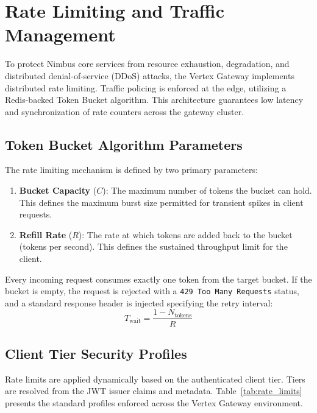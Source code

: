 \section{Rate Limiting and Traffic Management}
\label{sec:rate_limiting}

To protect Nimbus core services from resource exhaustion, degradation, and distributed denial-of-service (DDoS) attacks, the Vertex Gateway implements distributed rate limiting. Traffic policing is enforced at the edge, utilizing a Redis-backed Token Bucket algorithm. This architecture guarantees low latency and synchronization of rate counters across the gateway cluster.

\subsection{Token Bucket Algorithm Parameters}
The rate limiting mechanism is defined by two primary parameters:
\begin{enumerate}
    \item \textbf{Bucket Capacity} ($C$): The maximum number of tokens the bucket can hold. This defines the maximum burst size permitted for transient spikes in client requests.
    \item \textbf{Refill Rate} ($R$): The rate at which tokens are added back to the bucket (tokens per second). This defines the sustained throughput limit for the client.
\end{enumerate}

Every incoming request consumes exactly one token from the target bucket. If the bucket is empty, the request is rejected with a \texttt{429 Too Many Requests} status, and a standard response header is injected specifying the retry interval:
\begin{equation}
    T_{\text{wait}} = \frac{1 - N_{\text{tokens}}}{R}
\end{equation}

\subsection{Client Tier Security Profiles}
Rate limits are applied dynamically based on the authenticated client tier. Tiers are resolved from the JWT issuer claims and metadata. Table~\ref{tab:rate_limits} presents the standard profiles enforced across the Vertex Gateway environment.


